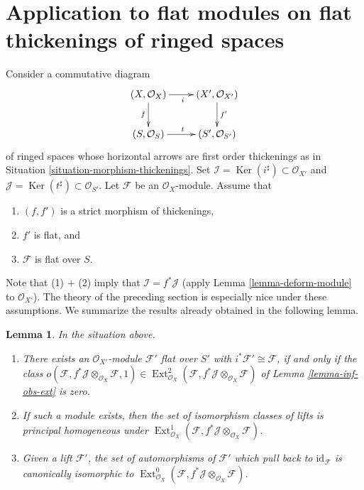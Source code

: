 \documentclass{stacks-project}
\theoremstyle{plain}
\newtheorem{lemma}[subsection]{Lemma}
\theoremstyle{definition}
\theoremstyle{remark}
\numberwithin{equation}{subsection}
\def\Ext{\mathop{\mathrm{Ext}}\nolimits}
\def\Ker{\mathop{\mathrm{Ker}}}
\begin{document}
\section{Application to flat modules on flat thickenings of ringed spaces}
\label{section-flat}

\noindent
Consider a commutative diagram
$$
\xymatrix{
(X, \mathcal{O}_X) \ar[r]_i \ar[d]_f & (X', \mathcal{O}_{X'}) \ar[d]^{f'} \\
(S, \mathcal{O}_S) \ar[r]^t & (S', \mathcal{O}_{S'})
}
$$
of ringed spaces whose horizontal arrows are first order thickenings as in
Situation \ref{situation-morphism-thickenings}. Set
$\mathcal{I} = \Ker(i^\sharp) \subset \mathcal{O}_{X'}$ and
$\mathcal{J} = \Ker(t^\sharp) \subset \mathcal{O}_{S'}$.
Let $\mathcal{F}$ be an $\mathcal{O}_X$-module. Assume that
\begin{enumerate}
\item $(f, f')$ is a strict morphism of thickenings,
\item $f'$ is flat, and
\item $\mathcal{F}$ is flat over $S$.
\end{enumerate}
Note that (1) $+$ (2) imply that $\mathcal{I} = f^*\mathcal{J}$
(apply Lemma \ref{lemma-deform-module} to $\mathcal{O}_{X'}$).
The theory of the preceding section is especially nice
under these assumptions. We summarize the results already obtained
in the following lemma.

\begin{lemma}
\label{lemma-flat}
In the situation above.
\begin{enumerate}
\item There exists an $\mathcal{O}_{X'}$-module $\mathcal{F}'$ flat over
$S'$ with $i^*\mathcal{F}' \cong \mathcal{F}$, if and only if
the class
$o(\mathcal{F}, f^*\mathcal{J} \otimes_{\mathcal{O}_X} \mathcal{F}, 1)
\in \Ext^2_{\mathcal{O}_X}(
\mathcal{F}, f^*\mathcal{J} \otimes_{\mathcal{O}_X} \mathcal{F})$
of Lemma \ref{lemma-inf-obs-ext} is zero.
\item If such a module exists, then the set of isomorphism classes
of lifts is principal homogeneous under
$\Ext^1_{\mathcal{O}_X}(
\mathcal{F}, f^*\mathcal{J} \otimes_{\mathcal{O}_X} \mathcal{F})$.
\item Given a lift $\mathcal{F}'$, the set of automorphisms of
$\mathcal{F}'$ which pull back to $\text{id}_\mathcal{F}$ is canonically
isomorphic to $\Ext^0_{\mathcal{O}_X}(
\mathcal{F}, f^*\mathcal{J} \otimes_{\mathcal{O}_X} \mathcal{F})$.
\end{enumerate}
\end{lemma}
\end{document}
